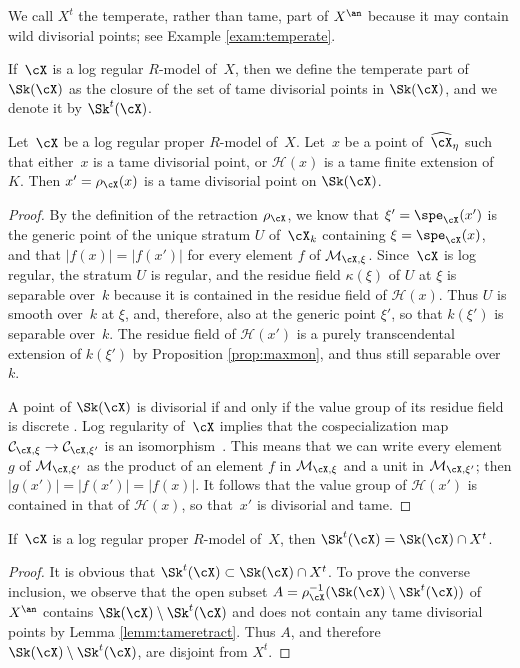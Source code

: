 We call $X^t$ the temperate, rather than tame, part of $X^{\an}$ because it may contain wild divisorial points; see Example \ref{exam:temperate}.

\begin{definition}
If~$\cX$ is a log regular $R$\nobreakdash-model of~$X$, then we define the temperate part of $\Sk(\cX)$
as the closure of the set of tame divisorial points in $\Sk(\cX)$, and we denote it by $\Sk^t(\cX)$.
\end{definition}

\begin{lemma}\label{lemm:tameretract}
Let~$\cX$ be a log regular proper $R$\nobreakdash-model of~$X$. Let~$x$ be a point of~$\widehat{\cX}_\eta$ such that either~$x$ is a tame divisorial point, or $\mathscr{H}(x)$ is a tame finite extension of~$K$. Then $x'=\rho_{\cX}(x)$ is a tame divisorial point on $\Sk(\cX)$.
\end{lemma}
\begin{proof}
By the definition of the retraction $\rho_{\cX}$, we know that $\xi'=\spe_{\cX}(x')$ is the generic point of the unique stratum $U$ of~$\cX_k$ containing $\xi=\spe_{\cX}(x)$, and that $|f(x)|=|f(x')|$ for every element $f$ of
$\mathcal{M}_{\cX,\xi}$. Since~$\cX$ is log regular, the stratum $U$ is regular, and the residue field $\kappa(\xi)$ of $U$ at $\xi$ is separable over~$k$ because it is contained in the residue field of $\mathscr{H}(x)$. Thus $U$ is smooth over~$k$ at $\xi$, and, therefore, also at the generic point $\xi'$, so that $k(\xi')$ is separable over~$k$. The residue field of $\mathscr{H}(x')$ is a purely transcendental extension of $k(\xi')$ by Proposition \ref{prop:maxmon}, and thus still separable over~$k$.

A point of $\Sk(\cX)$ is divisorial if and only if the value group of its residue field is discrete \cite[2.4.8]{MuNi}. Log regularity of~$\cX$ implies that the cospecialization map $\mathcal{C}_{\cX,\xi}\to \mathcal{C}_{\cX,\xi'}$ is an isomorphism~\cite[3.2.1]{logzeta}. This means that we can write every element $g$ of $\mathcal{M}_{\cX,\xi'}$ as the product of an element $f$ in $\mathcal{M}_{\cX,\xi}$ and a unit in $\mathcal{M}_{\cX,\xi'}$; then $|g(x')|=|f(x')|=|f(x)|$. It follows that the value group of $\mathscr{H}(x')$ is contained in that of $\mathscr{H}(x)$, so that~$x'$ is divisorial and tame.
\end{proof}

\begin{prop}\label{prop:tamesk}
If~$\cX$ is a log regular proper $R$\nobreakdash-model of~$X$, then $\Sk^t(\cX)=\Sk(\cX)\cap X^t$.
\end{prop}
\begin{proof}
It is obvious that $\Sk^t(\cX)\subset \Sk(\cX)\cap X^t$.
To prove the converse inclusion, we observe that the open subset $A=\rho_{\cX}^{-1}(\Sk(\cX)\setminus \Sk^t(\cX))$ of $X^{\an}$ contains $\Sk(\cX)\setminus \Sk^t(\cX)$ and does not contain any tame divisorial points by Lemma \ref{lemm:tameretract}. Thus $A$, and therefore $\Sk(\cX)\setminus \Sk^t(\cX)$, are disjoint from $X^t$.
\end{proof}

